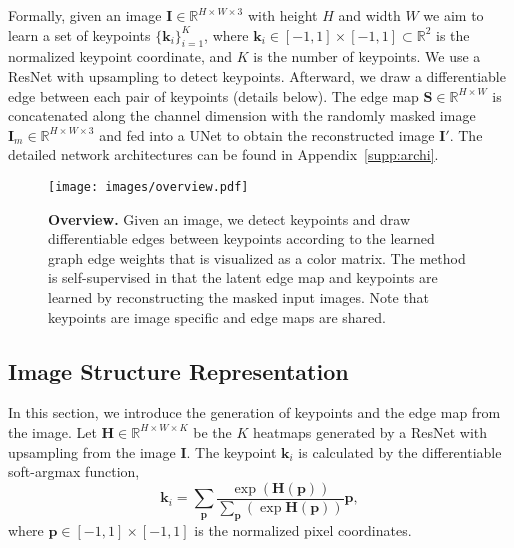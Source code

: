 \documentclass{article}
\newcommand{\R}{\mathbb{R}}
\newcommand{\vk}{\mathbf{k}}
\newcommand{\vp}{\mathbf{p}}
\newcommand{\mH}{\mathbf{H}}
\newcommand{\mI}{\mathbf{I}}
\newcommand{\mS}{\mathbf{S}}
\begin{document}
Formally, given an image $\mI\in\R^{H\times W\times 3}$ with height $H$ and width $W$ we aim to learn a set of keypoints $\{\vk_i\}_{i=1}^K$, where $\vk_i\in[-1,1]\times[-1,1]\subset \R^2$ is the normalized keypoint coordinate, and $K$ is the number of keypoints. 
We use a ResNet with upsampling \cite{xiao2018simple} to detect keypoints. Afterward, we draw a differentiable edge \cite{mihai2021differentiable} between each pair of keypoints (details below). 
The edge map $\mS\in\R^{H\times W}$ is concatenated along the channel dimension with the randomly masked image $\mI_m\in\R^{H\times W\times 3}$ and fed into a UNet \cite{ronneberger2015u} to obtain the reconstructed image $\mI'$. The detailed network architectures can be found in Appendix~\ref{supp:archi}. 

\begin{figure}[t]
\begin{center}
  \texttt{[image: images/overview.pdf]}
\end{center}
   \caption{\textbf{Overview.} Given an image, we detect keypoints and draw differentiable edges between keypoints according to the learned graph edge weights that is visualized as a color matrix. The method is self-supervised in that the latent edge map and keypoints are learned by reconstructing the masked input images. Note that keypoints are image specific and edge maps are shared.}
\label{fig:overview}
\end{figure}

\subsection{Image Structure Representation}

In this section, we introduce the generation of keypoints and the edge map from the image.
Let $\mH\in\R^{H\times W\times K}$ be the $K$ heatmaps generated by a ResNet with upsampling \cite{xiao2018simple} from the image $\mI$. The keypoint $\vk_i$ is calculated by the differentiable soft-argmax function,
\begin{equation}
    \vk_i = \sum_\vp \frac{ \exp(\mH(\vp)) }{\sum_\vp (\exp\mH(\vp))} \vp,
\end{equation}
where $\vp\in [-1,1]\times[-1, 1]$ is the normalized pixel coordinates.
\end{document}
